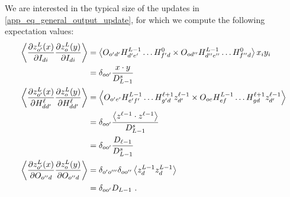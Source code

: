 We are interested in the typical size of the updates in \eqref{app_eq_general_output_update}, for which
we compute the following expectation values:
\begin{align}
\left  \langle \frac{ \partial z ^{ L }_{ o' }(x) }{ \partial I_{ di } }\frac{ \partial z^{ L }_{ o }(y) }{ \partial I_{ di } }  \right \rangle &=\left  \langle O_{ o'd' }H^{ L-1 }_{d'e' } \ldots  H^{ 0 }_{  f'd }\times  O_{ od'' }H^{ L-1 }_{d''e'' } \ldots  H^{ 0 }_{  f''d }\right  \rangle x_{ i } y_{ i }\nonumber\\
  &= \delta_{ oo' }\frac{ x \cdot y }{ D^{ s }_{ L-1 } } \nonumber\\
\left  \langle \frac{ \partial z ^{ L }_{ o' }(x) }{ \partial H^{ \ell }_{ dd' } }\frac{ \partial z^{ L }_{ o }(y) }{ \partial H^{ \ell }_{ dd' } }  \right \rangle &= \left \langle O_{ o'e' }H^{ L-1 }_{e'f' } \ldots  H^{ \ell+1 }_{  g'd } z^{ \ell-1 }_{ d' }\times O_{ oe }H^{ L-1 }_{ef } \ldots  H^{ \ell+1 }_{  gd } z^{ \ell-1 }_{ d' } \right  \rangle \nonumber\\
  &= \delta_{ oo' } \frac{ \left\langle z^{ \ell-1 }\cdot z^{ \ell-1 } \right\rangle }{ D^{ s }_{ L-1 } }\nonumber\\
  &= \delta_{ oo' }  \frac{D_{ \ell-1 }}{ D^{ s }_{ L-1 } }\nonumber\\
\left  \langle \frac{ \partial z ^{ L }_{ o' }(x) }{ \partial O_{ o''d } }\frac{ \partial z^{ L }_{ o }(y) }{ \partial O_{ o''d } }  \right \rangle &= \delta_{ o'o''' }\delta_{ oo'' } \left \langle z^{ L-1 }_{ d }z^{ L-1 }_{ d } \right  \rangle \nonumber\\
  &= \delta_{ oo' } D_{ L-1 }\ . \label{app_eq_mup_expectation_vals}
\end{align}

